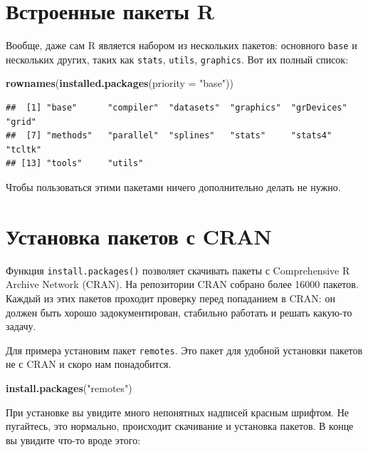 \documentclass[]{book}
\newenvironment{Shaded}{\begin{snugshade}}{\end{snugshade}}
\newcommand{\KeywordTok}[1]{\textcolor[rgb]{0.13,0.29,0.53}{\textbf{#1}}}
\newcommand{\DataTypeTok}[1]{\textcolor[rgb]{0.13,0.29,0.53}{#1}}
\newcommand{\StringTok}[1]{\textcolor[rgb]{0.31,0.60,0.02}{#1}}
\newcommand{\NormalTok}[1]{#1}
\begin{document}
\section{Встроенные пакеты R}\label{r_built_in}

Вообще, даже сам R является набором из нескольких пакетов: основного
\texttt{base} и нескольких других, таких как \texttt{stats},
\texttt{utils}, \texttt{graphics}. Вот их полный список:

\begin{Shaded}
\begin{Highlighting}[]
\KeywordTok{rownames}\NormalTok{(}\KeywordTok{installed.packages}\NormalTok{(}\DataTypeTok{priority =} \StringTok{"base"}\NormalTok{))}
\end{Highlighting}
\end{Shaded}

\begin{verbatim}
##  [1] "base"      "compiler"  "datasets"  "graphics"  "grDevices" "grid"     
##  [7] "methods"   "parallel"  "splines"   "stats"     "stats4"    "tcltk"    
## [13] "tools"     "utils"
\end{verbatim}

Чтобы пользоваться этими пакетами ничего дополнительно делать не нужно.

\section{Установка пакетов с CRAN}\label{install_cran}

Функция \texttt{install.packages()} позволяет скачивать пакеты с
Comprehensive R Archive Network (CRAN). На репозитории CRAN собрано
более 16000 пакетов. Каждый из этих пакетов проходит проверку перед
попаданием в CRAN: он должен быть хорошо задокументирован, стабильно
работать и решать какую-то задачу.

Для примера установим пакет \texttt{remotes}. Это пакет для удобной
установки пакетов не с CRAN и скоро нам понадобится.

\begin{Shaded}
\begin{Highlighting}[]
\KeywordTok{install.packages}\NormalTok{(}\StringTok{"remotes"}\NormalTok{)}
\end{Highlighting}
\end{Shaded}

При установке вы увидите много непонятных надписей красным шрифтом. Не
пугайтесь, это нормально, происходит скачивание и установка пакетов. В
конце вы увидите что-то вроде этого:
\end{document}

